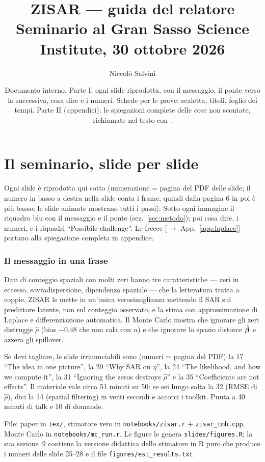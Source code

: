 \documentclass[11pt,a4paper]{article}
\title{ZISAR --- guida del relatore\\[4pt]\large Seminario al Gran Sasso Science Institute, 30 ottobre 2026}
\author{Niccolò Salvini}
\date{Documento interno. Parte I: ogni slide riprodotta, con il messaggio, il ponte verso la successiva, cosa dire e i numeri. Schede per le prove: scaletta, titoli, foglio dei tempi. Parte II (appendici): le spiegazioni complete delle cose non scontate, richiamate nel testo con \app{app:laplace}.}
\newcommand{\app}[1]{{\small\color{navy}[$\to$ App.~\ref{#1}]}}
\begin{document}
\maketitle
\tableofcontents

\part{Il seminario, slide per slide}

Ogni slide è riprodotta qui sotto (numerazione = pagina del PDF delle slide; il numero in basso a destra nella slide conta i frame, quindi dalla pagina 6 in poi è più basso; le slide animate mostrano tutti i passi). Sotto ogni immagine il riquadro blu con il messaggio e il ponte (sez.~\ref{sec:metodo}); poi cosa dire, i numeri, e i riquadri ``Possibile challenge''. Le frecce \app{app:laplace} portano alla spiegazione completa in appendice.

\section{Il messaggio in una frase}\label{sec:messaggio}
Dati di conteggio spaziali con molti zeri hanno tre caratteristiche --- zeri in eccesso, sovradispersione, dipendenza spaziale --- che la letteratura tratta a coppie. ZISAR le mette in un'unica verosimiglianza mettendo il SAR sul predittore latente, non sul conteggio osservato, e la stima con approssimazione di Laplace e differenziazione automatica. Il Monte Carlo mostra che ignorare gli zeri distrugge $\hat\rho$ (bias $-0.48$ che non cala con $n$) e che ignorare lo spazio distorce $\hat{\boldsymbol{\beta}}$ e azzera gli spillover.

Se devi tagliare, le slide irrinunciabili sono (numeri = pagina del PDF) la 17 ``The idea in one picture'', la 20 ``Why SAR on $\eta$'', la 24 ``The likelihood, and how we compute it'', la 31 ``Ignoring the zeros destroys $\hat\rho$'' e la 35 ``Coefficients are not effects''. Il materiale vale circa 51 minuti su 50: se sei lungo salta la 32 (RMSE di $\hat\rho$), dici la 14 (spatial filtering) in venti secondi e accorci i toolkit. Punta a 40 minuti di talk e 10 di domande.

File: paper in \texttt{tex/}, stimatore vero in \texttt{notebooks/zisar.r} + \texttt{zisar\_tmb.cpp}, Monte Carlo in \texttt{notebooks/mc\_run.r}. Le figure le genera \texttt{slides/figures.R}; la sua sezione~9 contiene la versione didattica dello stimatore in R puro che produce i numeri delle slide 25--28 e il file \texttt{figures/est\_results.txt}.
\end{document}
